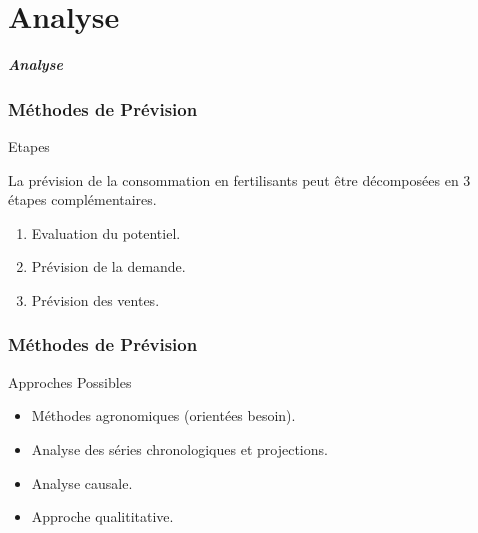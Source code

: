 \documentclass{beamer}
\begin{document}
\section{Analyse}

\begin{frame}
	\begin{center}
		\Huge \textbf{\textit{Analyse}}
	\end{center}
\end{frame}

\begin{frame}
  \frametitle{Méthodes de Prévision}
  \begin{block}{Etapes}
  \small{La prévision de la consommation en fertilisants peut être décomposées en 3 étapes complémentaires.
  \begin{enumerate}
  \item Evaluation du potentiel.
  \item Prévision de la demande.
  \item Prévision des ventes.
  \end{enumerate}
  }\end{block}
\end{frame}
\begin{frame}
  \frametitle{Méthodes de Prévision}
	\begin{block}{Approches Possibles}
	\small{
	\begin{itemize}
	\item Méthodes agronomiques (orientées besoin).
	\item Analyse des séries chronologiques et projections.
	\item Analyse causale.
	\item Approche qualititative.
	\end{itemize}
	}
	\end{block}
\end{frame}
\end{document}
